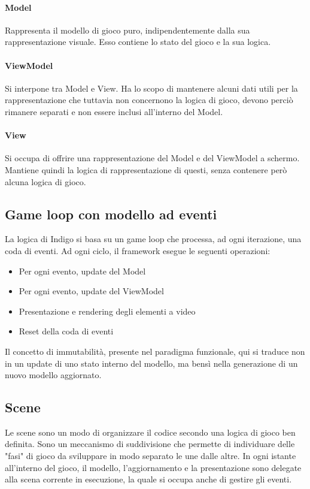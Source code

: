 \paragraph{Model}
Rappresenta il modello di gioco puro, indipendentemente dalla sua rappresentazione visuale. 
Esso contiene lo stato del gioco e la sua logica. 

\paragraph{ViewModel}
Si interpone tra Model e View. Ha lo scopo di mantenere alcuni dati utili per la rappresentazione che tuttavia non concernono la logica di gioco, devono perciò rimanere separati e non essere inclusi all'interno del Model.

\paragraph{View}
Si occupa di offrire una rappresentazione del Model e del ViewModel a schermo. Mantiene quindi la logica di rappresentazione di questi, senza contenere però alcuna logica di gioco.

\subsection{Game loop con modello ad eventi}
La logica di Indigo si basa su un game loop che processa, ad ogni iterazione, una coda di eventi. 
Ad ogni ciclo, il framework esegue le seguenti operazioni:
\begin{itemize}
    \item Per ogni evento, update del Model
    \item Per ogni evento, update del ViewModel
    \item Presentazione e rendering degli elementi a video
    \item Reset della coda di eventi
\end{itemize}

Il concetto di immutabilità, presente nel paradigma funzionale, qui si traduce non in un update di uno stato interno del modello, ma bensì nella generazione di un nuovo modello aggiornato. 

\subsection{Scene}
Le scene sono un modo di organizzare il codice secondo una logica di gioco ben definita. Sono un meccanismo di suddivisione che permette di individuare delle "fasi" di gioco da sviluppare in modo separato le une dalle altre.
In ogni istante all'interno del gioco, il modello, l'aggiornamento e la presentazione sono delegate alla scena corrente in esecuzione, la quale si occupa anche di gestire gli eventi. 

